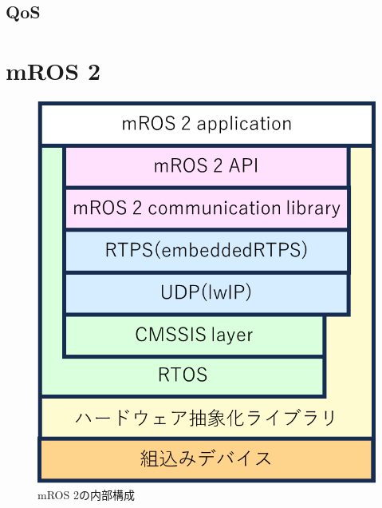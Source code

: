 \subsection{QoS}

\section{mROS 2}
\begin{figure}[ht]
    \centering
    \begin{minipage}{.48\textwidth}
        \centering
        \includegraphics[width=0.9\linewidth]{images/fig1_mros2_b.png}
        \caption{mROS 2の内部構成}
        \label{fig:subfig_a}
    \end{minipage}
    \hfill
    \begin{minipage}{.48\textwidth}
        \centering

\end{minipage}
\end{figure}
